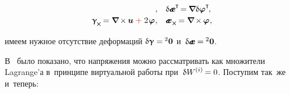 \begin{otherlanguage}{russian}
\begin{equation*}
\begin{array}{rl}
, &
\variation{\mathboldae}^{\T} \hspace{-0.32ex} = \hspace{-0.16ex} \boldnabla \variation{\fieldofrotations}^{\T} \hspace{-0.25ex} ,
\\[.2em]
%
\bm{\upgamma}_{\hspace{-0.16ex}\Xcompanion} \hspace{-0.16ex}
= \boldnabla \hspace{-0.16ex} \times \hspace{-0.1ex} \fieldofdisplacements \hspace{.12ex} {\color{red}{\hspace{.5ex} + \hspace{.5ex}}} \hspace{.12ex} 2 \hspace{.16ex} \fieldofrotations \hspace{.1ex}
, &
\mathboldae_{\hspace{.1ex}\Xcompanion} \hspace{-0.16ex}
= \boldnabla \hspace{-0.16ex} \times \hspace{-0.1ex} \fieldofrotations \hspace{.1ex} ,
\end{array}
\end{equation*}

\vspace{-0.5em} \noindent имеем нужное отсутствие деформаций
${\variation{\bm{\upgamma}} = \hspace{-0.1ex} {^2\bm{0}}}$ и~${\variation{\mathboldae} = \hspace{-0.1ex} {^2\bm{0}}}$.


В~ было показано, что напряжения можно рассматривать как множители Lagrange’а в~принципе виртуальной работы при~${\variation{\internalwork} = 0}$. Поступим так~же и~теперь:


\end{otherlanguage}
